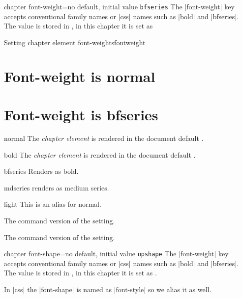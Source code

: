 \begin{docKey}[]{chapter font-weight}{=}{no default, initial value \texttt{bfseries}}
The |font-weight| key accepts \latexe conventional family names or |css| names such as |bold| and |bfseries|. The
value is stored in \cmd{\chapterfontweight@cx}, in this chapter it is set as \makeatletter\chapterfontweight@cx\makeatother

\begin{texexample}{Setting chapter element font-weights}{fontweight}
\chapter{Font-weight is normal}
\chapter{Font-weight is bfseries}
\lorem
\end{texexample}
\end{docKey}

\begin{marglist}
\item [normal] The \emph{chapter element} is rendered in the document default \cmd{\sffamily}.
\item [bold] The \emph{chapter element} is rendered in the document default \cmd{\rmfamily}.
\item[bfseries] Renders as bold.
\item[mdseries] renders as medium series.
\item[light] This is an alias for normal.
\item[\upshape\ttfamily\string\bfseries] The command version of the setting.
\item[\upshape\ttfamily\string\mdseries] The command version of the setting.
\end{marglist}

\begin{docKey}[]{chapter font-shape}{=}{no default, initial value \texttt{upshape}}
The |font-weight| key accepts \latexe conventional family names or |css| names such as |bold| and |bfseries|. The
value is stored in \cmd{\chapterfontweight@cx}, in this chapter it is set as  \makeatletter\texttt{\chapterfontweight@cx}\makeatother.
\end{docKey}

In |css| the |font-shape| is named as |font-style| so we alias it as well. 

